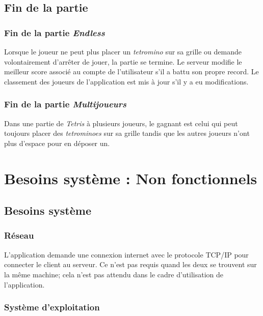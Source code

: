 \documentclass{article}
\begin{document}
\subsection{Fin de la partie}

\subsubsection{Fin de la partie \textit{Endless}}

Lorsque le joueur ne peut plus placer un \textit{tetromino} sur sa grille ou demande volontairement d'arrêter de jouer, la partie se termine. Le serveur modifie le meilleur score associé au compte de l'utilisateur s'il a battu son propre record. Le classement des joueurs de l'application est mis à jour s'il y a eu modifications. 

\subsubsection{Fin de la partie \textit{Multijoueurs}}

Dans une partie de \textit{Tetris} à plusieurs joueurs, le gagnant est celui qui peut toujours placer des \textit{tetrominoes} sur sa grille tandis que les autres joueurs n'ont plus d'espace pour en déposer un.

\section{Besoins système : Non fonctionnels}

\subsection{Besoins système}

\subsubsection{Réseau}


L'application demande une connexion internet avec le protocole TCP/IP pour connecter le client au serveur. Ce n'est pas requis quand les deux se trouvent sur la même machine; cela n'est pas attendu dans le cadre d'utilisation de l'application.

\subsubsection{Système d'exploitation}
\end{document}
